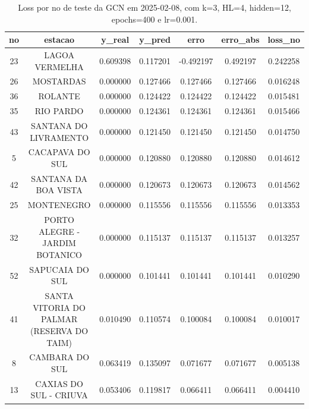 \begin{table}[h]
\centering
\caption{Loss por no de teste da GCN em 2025-02-08, com k=3, HL=4, hidden=12, epochs=400 e lr=0.001.}
\label{tab:gcn_loss_k3_hl4_h12_e400_d20250208}
\begin{tabular}{ccccccc}
\toprule
no & estacao & y\_real & y\_pred & erro & erro\_abs & loss\_no \\
\midrule
23 & LAGOA VERMELHA & 0.609398 & 0.117201 & -0.492197 & 0.492197 & 0.242258 \\
26 & MOSTARDAS & 0.000000 & 0.127466 & 0.127466 & 0.127466 & 0.016248 \\
36 & ROLANTE & 0.000000 & 0.124422 & 0.124422 & 0.124422 & 0.015481 \\
35 & RIO PARDO & 0.000000 & 0.124361 & 0.124361 & 0.124361 & 0.015466 \\
43 & SANTANA DO LIVRAMENTO & 0.000000 & 0.121450 & 0.121450 & 0.121450 & 0.014750 \\
5 & CACAPAVA DO SUL & 0.000000 & 0.120880 & 0.120880 & 0.120880 & 0.014612 \\
42 & SANTANA DA BOA VISTA & 0.000000 & 0.120673 & 0.120673 & 0.120673 & 0.014562 \\
25 & MONTENEGRO & 0.000000 & 0.115556 & 0.115556 & 0.115556 & 0.013353 \\
32 & PORTO ALEGRE - JARDIM BOTANICO & 0.000000 & 0.115137 & 0.115137 & 0.115137 & 0.013257 \\
52 & SAPUCAIA DO SUL & 0.000000 & 0.101441 & 0.101441 & 0.101441 & 0.010290 \\
41 & SANTA VITORIA DO PALMAR (RESERVA DO TAIM) & 0.010490 & 0.110574 & 0.100084 & 0.100084 & 0.010017 \\
8 & CAMBARA DO SUL & 0.063419 & 0.135097 & 0.071677 & 0.071677 & 0.005138 \\
13 & CAXIAS DO SUL - CRIUVA & 0.053406 & 0.119817 & 0.066411 & 0.066411 & 0.004410 \\
\bottomrule
\end{tabular}
\end{table}
